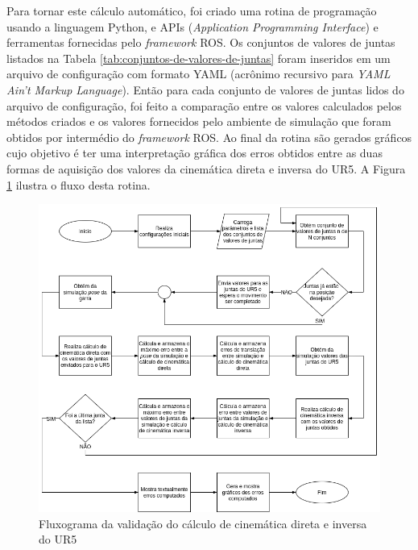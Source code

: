 Para tornar este cálculo automático, foi criado uma rotina de programação usando a linguagem Python, e APIs 
(\textit{Application Programming Interface}) e ferramentas fornecidas pelo \textit{framework}
ROS. Os conjuntos de valores de juntas listados na Tabela \ref{tab:conjuntos-de-valores-de-juntas} foram inseridos em um arquivo
de configuração com formato YAML (acrônimo recursivo para \textit{YAML Ain't Markup Language}).
Então para cada conjunto de valores de juntas lidos do arquivo de configuração, foi feito
a comparação entre os valores calculados pelos métodos criados e os valores fornecidos pelo 
ambiente de simulação que foram obtidos por intermédio do \textit{framework} ROS.
Ao final da rotina são gerados gráficos cujo objetivo é ter uma interpretação gráfica dos erros
obtidos entre as duas formas de aquisição dos valores da cinemática direta e inversa do UR5.
A Figura \ref{fig:fluxograma-rotina} ilustra o fluxo desta rotina.

\begin{figure}[htp]
	\centering
	\caption{Fluxograma da validação do cálculo de cinemática direta e inversa do UR5}
	\label{fig:fluxograma-rotina}
	\includegraphics[width=\textwidth]{images/fluxograma_da_validacao_do_calculo_de_cinematica_direta_e_inversa.png}
\end{figure} 

